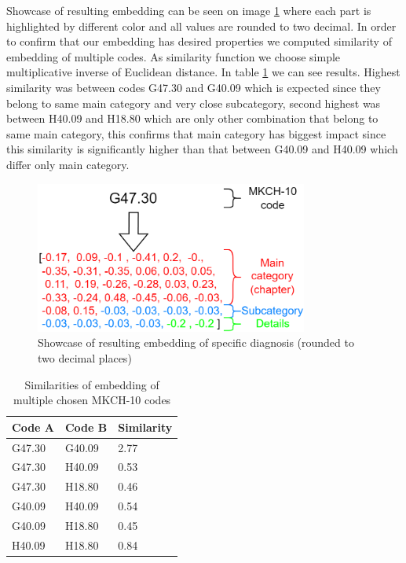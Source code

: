 Showcase of resulting embedding can be seen on image \ref{fig:diag_emb_show} where each part is highlighted by different color and all values are rounded to two decimal.
In order to confirm that our embedding has desired properties we computed similarity of embedding of multiple codes. As similarity function we choose simple multiplicative inverse of Euclidean distance. In table \ref{tab:diag_emb_show} we can see results. Highest similarity was between codes G47.30 and G40.09 which is expected since they belong to same main category and very close subcategory, second highest was between H40.09 and H18.80 which are only other combination that belong to same main category, this confirms that main category has biggest impact since this similarity is significantly higher than that between G40.09 and H40.09 which differ only main category.

\begin{figure}[!h]
	\centering
	
	\includegraphics[width=0.8\textwidth]{images/diagnosis_embed_showcase.png} 
	
	\caption{Showcase of resulting embedding of specific diagnosis (rounded to two decimal places)}
	\label{fig:diag_emb_show}
\end{figure} 


\begin{table}[!h]
	\centering
	\begin{tabular}{|l|l|l|}
		\hline
		Code A & Code B & Similarity \\ \hline
		G47.30 & G40.09 & 2.77       \\ \hline
		G47.30 & H40.09 & 0.53       \\ \hline
		G47.30 & H18.80 & 0.46       \\ \hline
		G40.09 & H40.09 & 0.54       \\ \hline
		G40.09 & H18.80 & 0.45       \\ \hline
		H40.09 & H18.80 & 0.84       \\ \hline
	\end{tabular}
	\caption{Similarities of embedding of multiple chosen MKCH-10 codes}
	\label{tab:diag_emb_show}
\end{table}  

